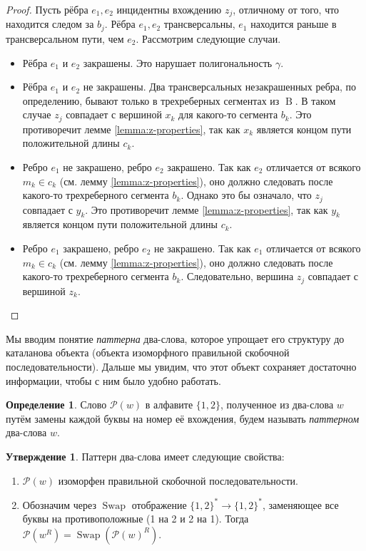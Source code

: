 \documentclass{article}
\theoremstyle{definition}
\newtheorem{conjecture}[theorem]{Утверждение}
\newtheorem{definition}[theorem]{Определение}
\newcommand{\pattern}{\mathcal{P}}
\newcommand{\B}{\operatorname{B}}
\begin{document}
\begin{proof}
    Пусть рёбра $e_1, e_2$ инцидентны вхождению $z_j$, отличному от того, что находится следом за $b_j$. Рёбра $e_1, e_2$ трансверсальны, $e_1$ находится раньше в трансверсальном пути, чем $e_2$.  Рассмотрим следующие случаи.

    \begin{itemize}
        \item Рёбра $e_1$ и $e_2$ закрашены. Это нарушает полигональность $\gamma$.
        \item Рёбра $e_1$ и $e_2$ не закрашены. Два трансверсальных незакрашенных ребра, по определению, бывают только в трехреберных сегментах из $\B$. В таком случае $z_j$ совпадает с вершиной $x_k$ для какого-то сегмента $b_k$. Это противоречит лемме \ref{lemma:z-properties}, так как $x_k$ является концом пути положительной длины $c_k$.
        \item  Ребро $e_1$ не закрашено, ребро $e_2$ закрашено. Так как $e_2$ отличается от всякого $m_k \in c_k$ (см. лемму \ref{lemma:z-properties}), оно должно следовать после какого-то трехреберного сегмента $b_k$. Однако это бы означало, что $z_j$ совпадает с $y_k$. Это противоречит лемме \ref{lemma:z-properties}, так как $y_k$ является концом пути положительной длины $c_k$.
        \item  Ребро $e_1$ закрашено, ребро $e_2$ не закрашено. Так как $e_1$ отличается от всякого $m_k \in c_k$ (см. лемму \ref{lemma:z-properties}), оно должно следовать после какого-то трехреберного сегмента $b_k$. Следовательно, вершина $z_j$ совпадает с вершиной $z_k$.
    \end{itemize}
\end{proof}

Мы вводим понятие \textit{паттерна} два-слова, которое упрощает его структуру до каталанова объекта (объекта изоморфного правильной скобочной последовательности). Дальше мы увидим, что этот объект сохраняет достаточно информации, чтобы с ним было удобно работать. 

\begin{definition}
    Слово $\pattern(w)$ в алфавите $\{1,2\}$, полученное из два-слова $w$ путём замены каждой буквы на номер её вхождения, будем называть \textit{паттерном} два-слова $w$.
\end{definition}

\begin{conjecture}
    Паттерн два-слова имеет следующие свойства:

    \begin{enumerate}
        \item $\pattern(w)$ изоморфен правильной скобочной последовательности.
        \item Обозначим через $\operatorname{Swap}$ отображение $\{1,2\}^* \to \{1,2\}^*$, заменяющее все буквы на противоположные (1 на 2 и 2 на 1). Тогда $\mathcal{P}(w^R) = \operatorname{Swap}(\pattern(w)^R)$. 
    \end{enumerate}
\end{conjecture}
\end{document}

